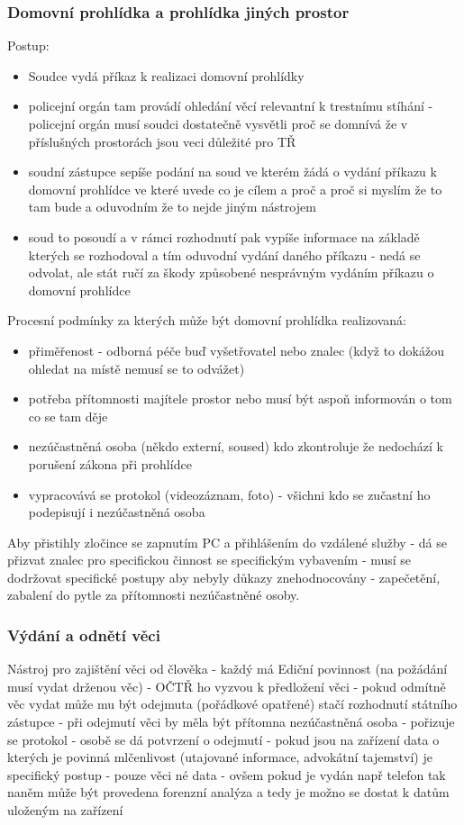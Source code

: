 \subsubsection*{Domovní prohlídka a prohlídka jiných prostor}
Postup:
\begin{itemize}
    \item Soudce vydá příkaz k realizaci domovní prohlídky
    \item  policejní orgán tam provádí ohledání věcí relevantní k trestnímu stíhání - policejní orgán musí soudci dostatečně vysvětli proč se domnívá že v příslušných prostorách jsou veci důležité pro TŘ
    \item soudní zástupce sepíše podání na soud ve kterém žádá o vydání příkazu k domovní prohlídce ve které uvede co je cílem a proč a proč si myslím že to tam bude a oduvodním že to nejde jiným nástrojem
    \item  soud to posoudí a v rámci rozhodnutí pak vypíše informace na základě kterých se rozhodoval a tím oduvodní vydání daného příkazu - nedá se odvolat, ale stát ručí za škody způsobené nesprávným vydáním příkazu o domovní prohlídce
\end{itemize}
Procesní podmínky za kterých může být domovní prohlídka realizovaná:
\begin{itemize}
    \item přiměřenost -  odborná péče buď vyšetřovatel nebo znalec (když to dokážou ohledat na místě nemusí se to odvážet)
    \item potřeba přítomnosti majítele prostor nebo musí být aspoň informován o tom co se tam děje
    \item nezúčastněná osoba (někdo externí, soused) kdo zkontroluje že nedochází k porušení zákona při prohlídce
    \item vypracovává se protokol (videozáznam, foto) - všichni kdo se zučastní ho podepisují i nezúčastněná osoba
\end{itemize}
Aby přistihly zločince se zapnutím PC a přihlášením do vzdálené služby - dá se přizvat znalec pro specifickou
činnost se specifickým vybavením - musí se dodržovat specifické postupy aby nebyly důkazy znehodnocovány - zapečetění, zabalení do pytle za přítomnosti nezúčastněné osoby.

\subsubsection*{Výdání a odnětí věci}
Nástroj pro zajištění věci od člověka - každý má Ediční povinnost (na požádání musí vydat drženou věc) - OČTŘ ho vyzvou k předložení věci - pokud odmítně věc vydat může mu být odejmuta (pořádkové opatřené) stačí rozhodnutí státního zástupce - při odejmutí věci by měla být přítomna nezúčastněná osoba - pořizuje se protokol - osobě se dá potvrzení o odejmutí - pokud jsou na zařízení data o kterých je povinná mlčenlivost (utajované informace, advokátní tajemství) je specifický postup - pouze věci né data - ovšem pokud je vydán např telefon tak naněm může být provedena forenzní analýza a tedy je možno se dostat k datům uloženým na zařízení

